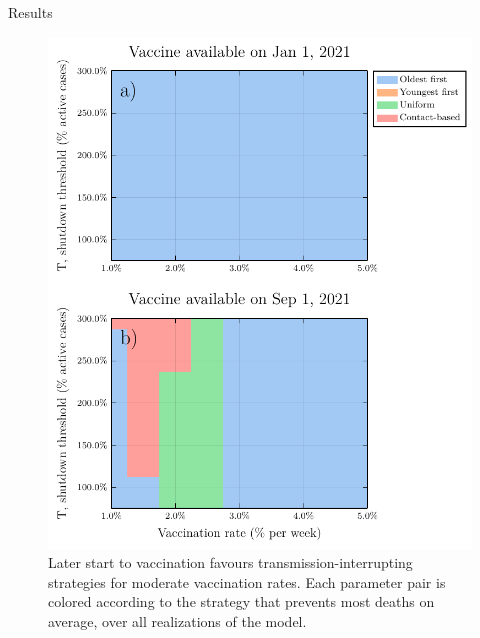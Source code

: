 \documentclass{beamer}
\begin{document}
\begin{frame}{Results}
    \begin{figure}
        \includegraphics[height = 0.6\textheight]{covid/bivariate_heatmap.pdf}
        
        \caption{\small Later start to vaccination favours transmission-interrupting strategies for moderate vaccination rates. Each parameter pair is colored according to the strategy that prevents most deaths on average, over all realizations of the model.}
    \end{figure}
\end{frame}
\end{document}
